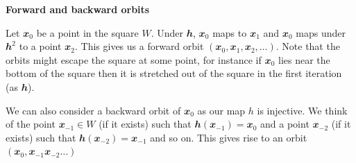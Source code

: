 \documentclass[
  a4paper,
  oneside,
  final]{krantz}
\renewcommand{\v}[1]{{\mathbfit{#1}}}
\theoremstyle{definition}
\theoremstyle{definition}
\theoremstyle{definition}
\theoremstyle{definition}
\theoremstyle{remark}
\begin{document}
\begin{palegreenbox}

\begin{center}
\textbf{Forward and backward orbits}

\end{center}

Let \(\v{x}_0\) be a point in the square \(W\). Under \(\v{h}\), \(\v{x}_0\) maps to \(\v{x}_1\) and \(\v{x}_0\) maps under \(\v{h}^2\) to a point \(\v{x}_2\). This gives us a forward orbit \((\v{x}_0, \v{x}_{1}, \v{x}_{2}, \ldots)\). Note that the orbits might escape the square at some point, for instance if \(\v{x}_{0}\) lies near the bottom of the square then it is stretched out of the square in the first iteration (as \(\v{h}\)).

We can also consider a backward orbit of \(\v{x}_0\) as our map \(h\) is injective. We think of the point \(\v{x}_{-1} \in W\) (if it exists) such that \(\v{h}(\v{x}_{-1}) = \v{x}_0\) and a point \(\v{x}_{-2}\) (if it exists) such that \(\v{h}(\v{x}_{-2}) = \v{x}_{-1}\) and so on. This gives rise to an orbit \((\v{x}_0, \v{x}_{-1} \v{x}_{-2} \ldots)\)

\end{palegreenbox}
\end{document}
